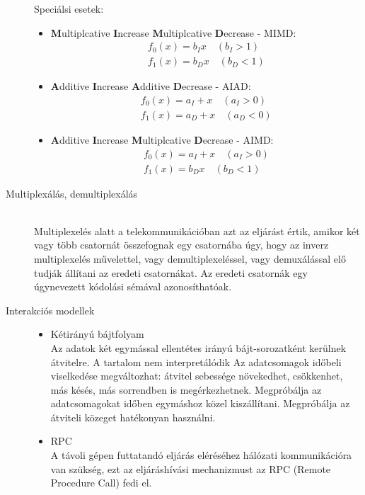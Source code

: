 \documentclass[margin=0px]{article}
\begin{document}
\begin{description}
				Speciálsi esetek:
				\begin{itemize}
					\item \textbf{M}ultiplcative \textbf{I}ncrease \textbf{M}ultiplcative \textbf{D}ecrease - MIMD:
					\begin{align*}
						f_0(x) = b_Ix \quad (b_I > 1)\\
						f_1(x) = b_Dx \quad (b_D < 1)
					\end{align*}
					\item \textbf{A}dditive \textbf{I}ncrease \textbf{A}dditive \textbf{D}ecrease - AIAD:
					\begin{align*}
						f_0(x) = a_I+x \quad (a_I > 0)\\
						f_1(x) = a_D+x \quad (a_D < 0)					
					\end{align*}
					\item \textbf{A}dditive \textbf{I}ncrease \textbf{M}ultiplcative \textbf{D}ecrease - AIMD:
					\begin{align*}
						f_0(x) = a_I+x \quad (a_I > 0)\\
						f_1(x) = b_Dx \quad (b_D < 1)
					\end{align*}
				\end{itemize}
				
			\item[Multiplexálás, demultiplexálás] \hfill \\
				Multiplexelés alatt a telekommunikációban azt az eljárást értik, amikor két vagy több csatornát összefognak egy csatornába úgy, hogy az inverz multiplexelés művelettel, vagy demultiplexeléssel, vagy demuxálással elő tudják állítani az eredeti csatornákat. Az eredeti csatornák egy úgynevezett kódolási sémával azonosíthatóak.
			\item[Interakciós modellek] \hfill
				\begin{itemize}
					\item Kétirányú bájtfolyam \\
						Az adatok két egymással ellentétes irányú bájt-sorozatként kerülnek átvitelre. A tartalom nem interpretálódik Az adatcsomagok időbeli viselkedése megváltozhat: átvitel sebessége növekedhet, csökkenhet, más késés, más sorrendben is megérkezhetnek. Megpróbálja az adatcsomagokat időben egymáshoz közel kiszállítani. Megpróbálja az átviteli közeget hatékonyan használni.
					
					\item RPC \\
						A távoli gépen futtatandó eljárás eléréséhez hálózati kommunikációra van szükség, ezt az eljáráshívási mechanizmust az RPC (Remote Procedure Call) fedi el. 
						

\end{itemize}
\end{description}
\end{document}
